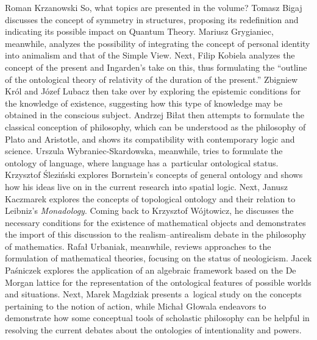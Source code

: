 \begin{recengenv}{Roman Krzanowski}
So, what topics are presented in the volume? Tomasz Bigaj discusses the concept of symmetry in structures, proposing its redefinition and indicating its possible impact on Quantum Theory. Mariusz Grygianiec, meanwhile, analyzes the possibility of integrating the concept of personal identity into animalism and that of the Simple View. Next, Filip Kobiela analyzes the concept of the present and Ingarden's take on this, thus formulating the “outline of the ontological theory of relativity of the duration of the present.'' Zbigniew Król and Józef Lubacz then take over by exploring the epistemic conditions for the knowledge of existence, suggesting how this type of knowledge may be obtained in the conscious subject. Andrzej Biłat then attempts to formulate the classical conception of philosophy, which can be understood as the philosophy of Plato and Aristotle, and shows its compatibility with contemporary logic and science. Urszula Wybraniec-Skardowska, meanwhile, tries to formulate the ontology of language, where language has a~particular ontological status. Krzysztof Śleziński explores Bornstein's concepts of general ontology and shows how his ideas live on in the current research into spatial logic. Next, Janusz Kaczmarek explores the concepts of topological ontology and their relation to Leibniz's \textit{Monadology}. Coming back to Krzysztof Wójtowicz, he discusses the necessary conditions for the existence of mathematical objects and demonstrates the import of this discussion to the realism–antirealism debate in the philosophy of mathematics. Rafał Urbaniak, meanwhile, reviews approaches to the formulation of mathematical theories, focusing on the status of neologicism. Jacek Paśniczek explores the application of an algebraic framework based on the De Morgan lattice for the representation of the ontological features of possible worlds and situations. Next, Marek Magdziak presents a~logical study on the concepts pertaining to the notion of action, while Michał Głowala endeavors to demonstrate how some conceptual tools of scholastic philosophy can be helpful in resolving the current debates about the ontologies of intentionality and powers.


\end{recengenv}
